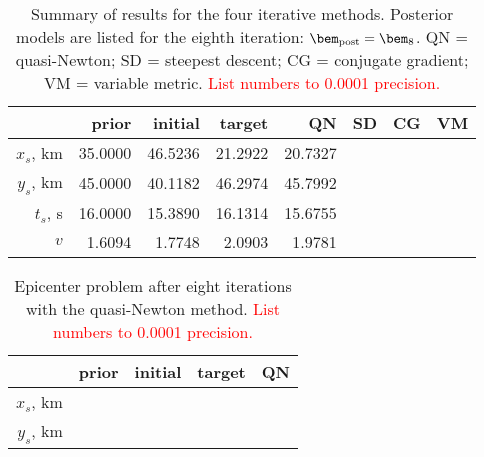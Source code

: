 \documentclass[11pt,titlepage,fleqn]{article}
\begin{document}


\vspace{4cm}

\begin{table}[h]
\centering
\caption[]{
Summary of results for the four iterative methods.
Posterior models are listed for the eighth iteration: $\bem_{\rm post} = \bem_8$.
QN = quasi-Newton; SD = steepest descent; CG = conjugate gradient; VM = variable metric.
\textcolor{red}{List numbers to 0.0001 precision.}
\label{tab}
}
\begin{spacing}{1.4}
\begin{tabular}{r||r|r|r||r|r|r|r}
\hline
& prior & initial & target & QN & SD \hspace{1cm} & CG \hspace{1cm}  & VM \hspace{1cm}  \\
\hline\hline 
$x_s$, km & 35.0000 & 46.5236 & 21.2922 & 20.7327 & & \\ \hline
$y_s$, km & 45.0000 & 40.1182 & 46.2974 & 45.7992 & & \\ \hline
$t_s$, s  & 16.0000 & 15.3890 & 16.1314 & 15.6755 & & \\ \hline
$v$       &  1.6094 &  1.7748 &  2.0903 &  1.9781 & & \\ \hline
\end{tabular}
\end{spacing}
\end{table}

\begin{table}
\centering
\caption[]{
Epicenter problem after eight iterations with the quasi-Newton method.
\textcolor{red}{List numbers to 0.0001 precision.}
\label{tab:epi}
}
\begin{spacing}{1.4}
\begin{tabular}{r||r|r|r||r}
\hline
& prior & initial & target & QN \\
\hline\hline 
$x_s$, km & \hspace{2cm} & \hspace{2cm} & \hspace{2cm} & \hspace{2cm} \\ \hline
$y_s$, km & & & &  \\ \hline
\end{tabular}
\end{spacing}
\end{table}
\end{document}
